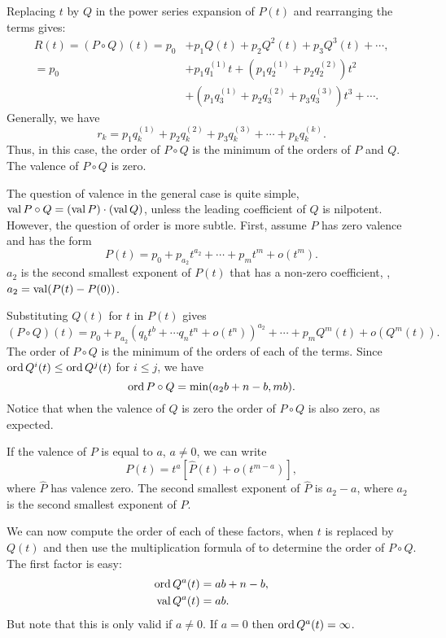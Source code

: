 Replacing $t$ by $Q$ in the power series expansion of $P(t)$ and
rearranging the terms gives:
\[
\begin{aligned}
R(t) = (P\circ Q)(t)  = 
 p_0 &+ p_1 Q(t) + p_2 Q^2(t) + p_3 Q^3(t) + \cdots, \\
 = 
 p_0 &+ p_1 q^{(1)}_1 t + (p_1 q^{(1)}_2 + p_2 q^{(2)}_2)t^2 \\
   &+ (p_1 q^{(1)}_3 + p_2 q^{(2)}_3 + p_3 q^{(3)}_3)t^3 + \cdots.
\end{aligned}
\]
Generally, we have
\begin{equation} \label{FPS:Composition:Eq}
r_k = p_1 q^{(1)}_k + p_2 q^{(2)}_k + p_3 q^{(3)}_k + \cdots + p_k q^{(k)}_k.
\end{equation}
Thus, in this case, the order of $P\circ Q$ is the minimum of the
orders of $P$ and $Q$.  The valence of $P\circ Q$ is zero.

The question of valence in the general case is quite simple, $\mathop{\rm val}\nolimits
P\circ Q = (\mathop{\rm val}\nolimits P) \cdot (\mathop{\rm val}\nolimits Q)$, unless the leading coefficient of
$Q$ is nilpotent.  However, the question of order is more subtle.
First, assume $P$ has zero valence and has the form
\[
P(t) = p_0 + p_{a_2} t^{a_2} + \cdots + p_m t^m + o(t^m).
\]
$a_2$ is the second smallest exponent of $P(t)$ that has a non-zero
coefficient, \ie, $a_2 = \mathop{\rm val}\nolimits (P(t) - P(0))$.

Substituting $Q(t)$ for $t$ in $P(t)$ gives
\[
(P \circ Q)(t) = p_0 + p_{a_2}(q_b t^b + \cdots q_n t^n +
o(t^n))^{a_2}
+ \cdots +
p_m Q^m(t) + o(Q^m(t)).
\]
The order of $P\circ Q$ is the minimum of the orders of each of the
terms.  Since $\mathop{\rm ord}\nolimits Q^i(t) \le \mathop{\rm ord}\nolimits Q^j(t)$ for $i \le j$, we have
\[
\mathop{\rm ord}\nolimits P\circ Q = \min(a_2 b + n - b, mb).
\]
Notice that when the valence of $Q$ is zero the order of $P \circ Q$
is also zero, as expected. 

If the valence of $P$ is equal to $a$, $a \not= 0$, we can write
\[
P(t) = t^a \left[\hat{P}(t) + o(t^{m-a})\right],
\]
where $\hat{P}$ has valence zero.  The second smallest exponent of
$\hat{P}$ is $a_2 - a$, where $a_2$ is the second smallest exponent of
$P$.

We can now compute the order of each of these factors, when $t$ is
replaced by $Q(t)$ and then use the multiplication formula of
 to determine the order of $P \circ Q$.  The
first factor is easy:
\[
\begin{aligned}
\mathop{\rm ord}\nolimits Q^a(t) &= ab + n - b, \\
\mathop{\rm val}\nolimits Q^a(t) & = a b.
\end{aligned}
\]
But note that this is only valid if $a \not= 0$.  If $a = 0$ then
$\mathop{\rm ord}\nolimits Q^a(t) = \infty$.

